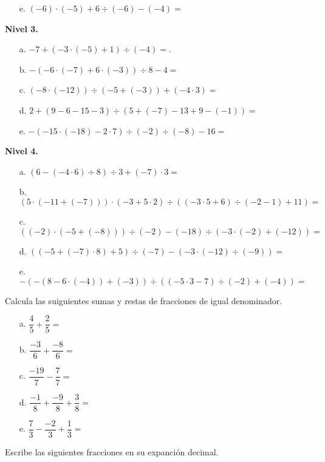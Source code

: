 \documentclass[spanish,letterpaper, 11pt, addpoints, answers]{exam}
\begin{document}
\begin{questions}
\begin{itemize}
  \item[e.] $(-6)\cdot(-5)+6\div(-6)-(-4)=$
  
  \end{itemize}
  
  \textbf{Nivel 3.}
  \begin{itemize}
  \item[a.] $-7+(-3\cdot (-5)+1)\div(-4)=$.
  
  \item[b.] $-(-6\cdot (-7)+6\cdot(-3))\div 8-4=$
  
  \item[c.] $(-8\cdot (-12))\div (-5+(-3))+(-4\cdot 3)=$
  
  \item[d.] $2+(9-6-15-3)\div (5+(-7)-13+9-(-1))=$ 
  
  \item[e.] $-(-15\cdot (-18)-2\cdot 7)\div (-2)\div (-8)-16=$ 
  
  \end{itemize}
  
  \textbf{Nivel 4.}
  \begin{itemize}
  \item[a.] $(6-(-4\cdot 6)\div 8)\div 3+(-7)\cdot 3=$
  
  \item[b.] $(5\cdot (-11+(-7)))\cdot(-3+5\cdot 2)\div((-3\cdot 5+6)\div (-2-1)+11)=$
  
  \item[c.] $((-2)\cdot (-5+(-8)))\div (-2)-(-18)\div(-3\cdot (-2)+(-12))=$
  
  \item[d.] $((-5+(-7)\cdot 8)+5)\div (-7)-(-3\cdot (-12 )\div (-9))=$
  
  \item[e.] $-(-(8-6\cdot (-4))+(-3))\div ((-5\cdot 3-7)\div(-2)+(-4))=$
  
  \end{itemize}

\question Calcula las suiguientes sumas y restas de fracciones de igual denominador.

\begin{itemize}
  \item[a.] $\dfrac{4}{5}+\dfrac{2}{5}=$
  \item[b.] $\dfrac{-3}{6}+\dfrac{-8}{6}=$
  \item[c.] $\dfrac{-19}{7}-\dfrac{7}{7}=$
  \item[d.] $\dfrac{-1}{8}+\dfrac{-9}{8}+\dfrac{3}{8}=$
  \item[e.] $\dfrac{7}{3}-\dfrac{-2}{3}+\dfrac{1}{3}=$  
\end{itemize}
\newpage
\question Escribe las siguientes fracciones en su expanción decimal.


\end{questions}
\end{document}
